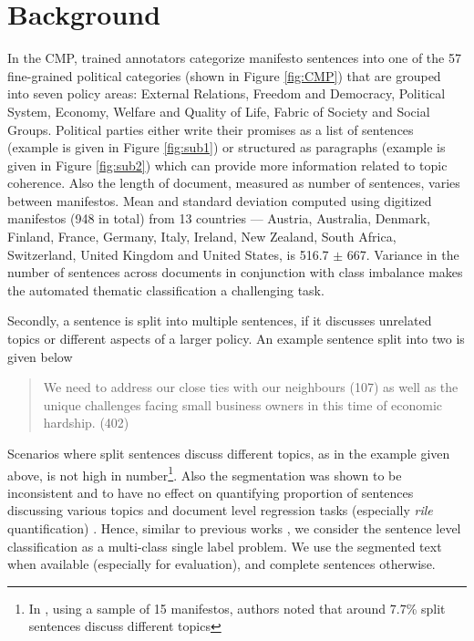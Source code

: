 \documentclass[11pt,a4paper]{article}
\begin{document}
\section{Background}

In the CMP, trained annotators categorize manifesto sentences into one of the 57 fine-grained political categories (shown in Figure \ref{fig:CMP}) that are grouped into seven policy areas: External Relations, Freedom and Democracy, Political System, Economy, Welfare and Quality of Life, Fabric of Society and Social Groups. Political parties either write their promises as a list of sentences (example is given in Figure \ref{fig:sub1}) or structured as paragraphs (example is given in Figure \ref{fig:sub2}) which can provide more information related to topic coherence. Also the length of document, measured as number of sentences, varies between manifestos. Mean and standard deviation computed using digitized manifestos (948 in total) from 13 countries --- Austria, Australia, Denmark, Finland, France, Germany, Italy, Ireland, New Zealand, South Africa, Switzerland, United Kingdom and United States, is 516.7 $\pm$ 667. Variance in the number of sentences across documents in conjunction with class imbalance makes the automated thematic classification a challenging task.  

Secondly, a sentence is split into multiple sentences, if it discusses unrelated topics or different aspects of a larger policy. An example sentence split into two is given below

\begin{quote}
\color{red}
We need to address our close ties with our neighbours (107) \color{blue} as well as the unique challenges facing small business owners in this time of economic hardship. (402)
\end{quote}
Scenarios where split sentences discuss different topics, as in the example given above, is not high in number\footnote{In \cite{daubler2012natural}, using a sample of 15 manifestos, authors noted that around 7.7\% split sentences discuss different topics}. Also the segmentation was shown to be inconsistent and to have no effect on quantifying proportion of sentences discussing various topics and document level regression tasks (especially \textit{rile} quantification) \cite{daubler2012natural}. Hence, similar to previous works \cite{biessmann2016automating, W17-2906}, we consider the sentence level classification as a multi-class single label problem. We use the segmented text when available (especially for evaluation), and complete sentences otherwise.
\end{document}
